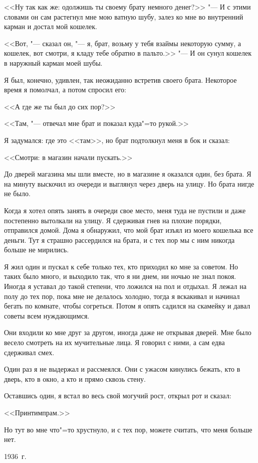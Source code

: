 <<Ну так как же: одолжишь ты своему брату немного денег?>> "--- И с этими 
словами он сам растегнул мне мою ватную шубу, залез ко мне во внутренний 
карман и достал мой кошелек.

<<Вот, "--- сказал он, "--- я, брат, возьму у тебя взаймы некоторую сумму, а 
кошелек, вот смотри, я кладу тебе обратно в пальто.>> "--- И он сунул 
кошелек в наружный карман моей шубы.

Я был, конечно, удивлен, так неожиданно встретив своего брата. Некоторое 
время я помолчал, а потом спросил его:

<<А где же ты был до сих пор?>>

<<Там, "--- отвечал мне брат и показал куда"=то рукой.>>

Я задумался: где это <<там>>, но брат подтолкнул меня в бок и сказал:

<<Смотри: в магазин начали пускать.>>

До дверей магазина мы шли вместе, но в магазине я оказался один, без 
брата. Я на минуту выскочил из очереди и выглянул через дверь на улицу. Но 
брата нигде не было.

Когда я хотел опять занять в очереди свое место, меня туда не пустили и 
даже постепенно вытолкали на улицу. Я сдерживая гнев на плохие порядки, 
отправился домой. Дома я обнаружил, что мой брат изъял из моего кошелька 
все деньги. Тут я страшно рассердился на брата, и с тех пор мы с ним 
никогда больше не мирились.

Я жил один и пускал к себе только тех, кто приходил ко мне за советом. Но 
таких было много, и выходило так, что я ни днем, ни ночью не знал покоя. 
Иногда я уставал до такой степени, что ложился на пол и отдыхал. Я лежал 
на полу до тех пор, пока мне не делалось холодно, тогда я вскакивал и 
начинал бегать по комнате, чтобы согреться. Потом я опять садился на 
скамейку и давал советы всем нуждающимся.

Они входили ко мне друг за другом, иногда даже не открывая дверей. Мне 
было весело смотреть на их мучительные лица. Я говорил с ними, а сам едва 
сдерживал смех.

Один раз я не выдержал и рассмеялся. Они с ужасом кинулись бежать, кто в 
дверь, кто в окно, а кто и прямо сквозь стену.

Оставшись один, я встал во весь свой могучий рост, открыл рот и сказал:

<<Принтимпрам.>>

Но тут во мне что"=то хрустнуло, и с тех пор, можете считать, что меня 
больше нет.

1936~г.
